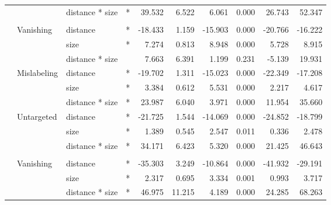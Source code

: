 \documentclass[
]{article}
\begin{document}
\begin{longtable}[t]{llllrrrrrr}
\cmidrule{3-10}\nopagebreak
\hspace{1em} &  & distance * size & * & 39.532 & 6.522 & 6.061 & 0.000 & 26.743 & 52.347\\
\cmidrule{1-10}\pagebreak[0]
\addlinespace[0.3em]
\multicolumn{10}{l}{\textbf{SSD}}\\
\hspace{1em} & Vanishing & distance & * & -18.433 & 1.159 & -15.903 & 0.000 & -20.766 & -16.222\\
\cmidrule{3-10}\nopagebreak
\hspace{1em} &  & size & * & 7.274 & 0.813 & 8.948 & 0.000 & 5.728 & 8.915\\
\cmidrule{3-10}\nopagebreak
\hspace{1em} &  & distance * size &  & 7.663 & 6.391 & 1.199 & 0.231 & -5.139 & 19.931\\
\cmidrule{2-10}\nopagebreak
\hspace{1em} & Mislabeling & distance & * & -19.702 & 1.311 & -15.023 & 0.000 & -22.349 & -17.208\\
\cmidrule{3-10}\nopagebreak
\hspace{1em} &  & size & * & 3.384 & 0.612 & 5.531 & 0.000 & 2.217 & 4.617\\
\cmidrule{3-10}\nopagebreak
\hspace{1em} &  & distance * size & * & 23.987 & 6.040 & 3.971 & 0.000 & 11.954 & 35.660\\
\cmidrule{2-10}\nopagebreak
\hspace{1em} & Untargeted & distance & * & -21.725 & 1.544 & -14.069 & 0.000 & -24.852 & -18.799\\
\cmidrule{3-10}\nopagebreak
\hspace{1em} &  & size & * & 1.389 & 0.545 & 2.547 & 0.011 & 0.336 & 2.478\\
\cmidrule{3-10}\nopagebreak
\hspace{1em} &  & distance * size & * & 34.171 & 6.423 & 5.320 & 0.000 & 21.425 & 46.643\\
\cmidrule{1-10}\pagebreak[0]
\addlinespace[0.3em]
\multicolumn{10}{l}{\textbf{RetinaNet}}\\
\hspace{1em} & Vanishing & distance & * & -35.303 & 3.249 & -10.864 & 0.000 & -41.932 & -29.191\\
\cmidrule{3-10}\nopagebreak
\hspace{1em} &  & size & * & 2.317 & 0.695 & 3.334 & 0.001 & 0.993 & 3.717\\
\cmidrule{3-10}\nopagebreak
\hspace{1em} &  & distance * size & * & 46.975 & 11.215 & 4.189 & 0.000 & 24.285 & 68.263\\

\end{longtable}
\end{document}
